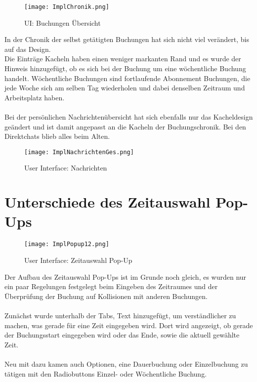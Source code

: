 \newpage

\begin{wrapfigure}[14]{r}{5.5cm}
  \texttt{[image: ImplChronik.png]}
  \caption{UI: Buchungen Übersicht}
\end{wrapfigure}

In der Chronik der selbst getätigten Buchungen hat sich nicht viel verändert, bis auf das Design.
\\
Die Einträge Kacheln haben einen weniger markanten Rand und es wurde der Hinweis hinzugefügt, ob es sich bei der Buchung um eine wöchentliche Buchung handelt.
Wöchentliche Buchungen sind fortlaufende Abonnement Buchungen, die jede Woche sich am selben Tag wiederholen und dabei denselben Zeitraum und Arbeitsplatz haben.
\paragraph{}
Bei der persönlichen Nachrichtenübersicht hat sich ebenfalls nur das Kacheldesign geändert und ist damit angepasst an die Kacheln der Buchungschronik.
Bei den Direktchats blieb alles beim Alten.
\vspace{29mm}
\begin{figure}[!h]
  \centering
  \texttt{[image: ImplNachrichtenGes.png]}
  \caption{User Interface: Nachrichten}
  \label{fig:UI_Messages}
\end{figure}

\newpage

\section{Unterschiede des Zeitauswahl Pop-Ups}

\begin{figure}[!h]
  \centering
  \texttt{[image: ImplPopup12.png]}
  \caption{User Interface: Zeitauswahl Pop-Up}
  \label{fig:UI_timePopUp}
\end{figure}

Der Aufbau des Zeitauswahl Pop-Ups ist im Grunde noch gleich, es wurden nur ein paar Regelungen festgelegt beim Eingeben des Zeitraumes und der Überprüfung der Buchung auf Kollisionen mit anderen Buchungen.
\paragraph{}
Zunächst wurde unterhalb der Tabs, Text hinzugefügt, um verständlicher zu machen, was gerade für eine Zeit eingegeben wird.
Dort wird angezeigt, ob gerade der Buchungsstart eingegeben wird oder das Ende, sowie die aktuell gewählte Zeit.
\\\\
Neu mit dazu kamen auch Optionen, eine Dauerbuchung oder Einzelbuchung zu tätigen mit den Radiobuttons Einzel- oder Wöchentliche Buchung.
